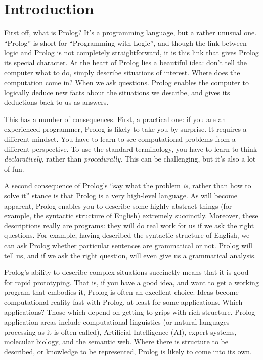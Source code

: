 
\chapter*{Introduction}\label{INTRODUCTION}

First off, what is Prolog? It's a programming language, but a rather
unusual one. ``Prolog'' is short for ``Programming with Logic'', and
though the link between logic and Prolog is not completely
straightforward, it is this link that gives Prolog its special
character.  At the heart of Prolog lies a beautiful idea: don't tell
the computer what to do, simply describe situations of interest. Where
does the computation come in? When we ask questions.  Prolog enables
the computer to logically deduce new facts about the situations we
describe, and gives its deductions back to us as answers.

This has a number of consequences. First, a practical one: if you are
an experienced programmer, Prolog is likely to take you by
surprise. It requires a different mindset.  You have to learn to see
computational problems from a different perspective.  To use the
standard terminology, you have to learn to think
\textit{declaratively}, rather than \textit{procedurally}.  This can
be challenging, but it's also a lot of fun.

A second consequence of Prolog's ``say what the problem \textit{is},
rather than how to solve it'' stance is that Prolog is a very 
high-level language. As will become apparent, Prolog enables you to
describe some highly abstract things (for example, the syntactic
structure of English) extremely succinctly. Moreover, these
descriptions really are programs: they will do real work for us if we
ask the right questions. For example, having described the syntactic
structure of English, we can ask Prolog whether particular sentences
are grammatical or not. Prolog will tell us, and if we ask the right
question, will even give us a grammatical analysis.

Prolog's ability to describe complex situations succinctly means that
it is good for rapid prototyping.  That is, if you have a good idea,
and want to get a working program that embodies it, Prolog is often an
excellent choice. Ideas become computational reality fast with Prolog,
at least for some applications.  Which applications?  Those which
depend on getting to grips with rich structure.  Prolog application
areas include computational linguistics (or natural languages
processing as it is often called), Artificial Intelligence (AI),
expert systems, molecular biology, and the semantic web. Where there
is structure to be described, or knowledge to be represented, Prolog
is likely to come into its own.

